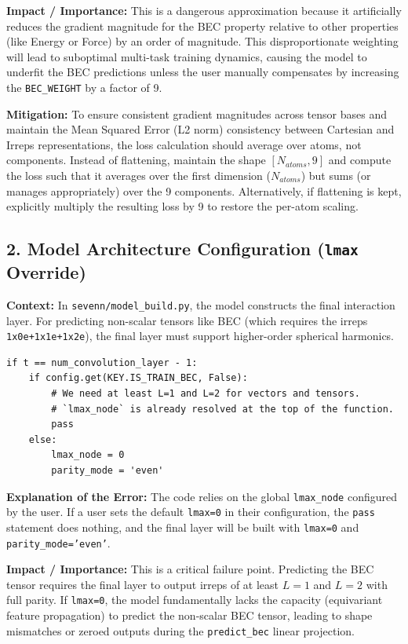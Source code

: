 \documentclass[12pt]{article}
\begin{document}
\textbf{Impact / Importance:} This is a dangerous approximation because it artificially reduces the gradient magnitude for the BEC property relative to other properties (like Energy or Force) by an order of magnitude. This disproportionate weighting will lead to suboptimal multi-task training dynamics, causing the model to underfit the BEC predictions unless the user manually compensates by increasing the \texttt{BEC\_WEIGHT} by a factor of 9.

\textbf{Mitigation:} To ensure consistent gradient magnitudes across tensor bases and maintain the Mean Squared Error (L2 norm) consistency between Cartesian and Irreps representations, the loss calculation should average over atoms, not components.
Instead of flattening, maintain the shape $[N_{atoms}, 9]$ and compute the loss such that it averages over the first dimension ($N_{atoms}$) but sums (or manages appropriately) over the 9 components. Alternatively, if flattening is kept, explicitly multiply the resulting loss by 9 to restore the per-atom scaling.

\subsection{2. Model Architecture Configuration (\texttt{lmax} Override)}
\textbf{Context:} In \texttt{sevenn/model\_build.py}, the model constructs the final interaction layer. For predicting non-scalar tensors like BEC (which requires the irreps \texttt{1x0e+1x1e+1x2e}), the final layer must support higher-order spherical harmonics.
\begin{verbatim}
if t == num_convolution_layer - 1:
    if config.get(KEY.IS_TRAIN_BEC, False):
        # We need at least L=1 and L=2 for vectors and tensors.
        # `lmax_node` is already resolved at the top of the function.
        pass
    else:
        lmax_node = 0
        parity_mode = 'even'
\end{verbatim}

\textbf{Explanation of the Error:} The code relies on the global \texttt{lmax\_node} configured by the user. If a user sets the default \texttt{lmax=0} in their configuration, the \texttt{pass} statement does nothing, and the final layer will be built with \texttt{lmax=0} and \texttt{parity\_mode='even'}.

\textbf{Impact / Importance:} This is a critical failure point. Predicting the BEC tensor requires the final layer to output irreps of at least $L=1$ and $L=2$ with full parity. If \texttt{lmax=0}, the model fundamentally lacks the capacity (equivariant feature propagation) to predict the non-scalar BEC tensor, leading to shape mismatches or zeroed outputs during the \texttt{predict\_bec} linear projection.
\end{document}
